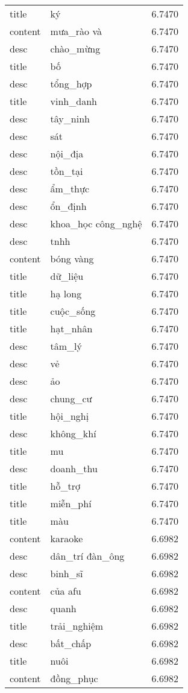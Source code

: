 \documentclass{article}
\begin{document}
\begin{tabular}{lll}
title & ký & 6.7470\\
content & mưa\_rào và & 6.7470\\
desc & chào\_mừng & 6.7470\\
title & bố & 6.7470\\
desc & tổng\_hợp & 6.7470\\
title & vinh\_danh & 6.7470\\
desc & tây\_ninh & 6.7470\\
desc & sát & 6.7470\\
desc & nội\_địa & 6.7470\\
desc & tồn\_tại & 6.7470\\
desc & ẩm\_thực & 6.7470\\
desc & ổn\_định & 6.7470\\
desc & khoa\_học công\_nghệ & 6.7470\\
desc & tnhh & 6.7470\\
content & bóng vàng & 6.7470\\
title & dữ\_liệu & 6.7470\\
title & hạ long & 6.7470\\
title & cuộc\_sống & 6.7470\\
title & hạt\_nhân & 6.7470\\
desc & tâm\_lý & 6.7470\\
desc & vẻ & 6.7470\\
desc & ảo & 6.7470\\
desc & chung\_cư & 6.7470\\
title & hội\_nghị & 6.7470\\
desc & không\_khí & 6.7470\\
title & mu & 6.7470\\
desc & doanh\_thu & 6.7470\\
title & hỗ\_trợ & 6.7470\\
title & miễn\_phí & 6.7470\\
title & màu & 6.7470\\
content & karaoke & 6.6982\\
desc & dân\_trí đàn\_ông & 6.6982\\
desc & binh\_sĩ & 6.6982\\
content & của afu & 6.6982\\
desc & quanh & 6.6982\\
title & trải\_nghiệm & 6.6982\\
desc & bất\_chấp & 6.6982\\
title & nuôi & 6.6982\\
content & đồng\_phục & 6.6982\\

\end{tabular}
\end{document}
